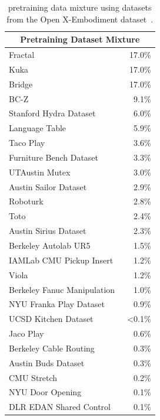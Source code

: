 \begin{appendices}
\begin{table}[th]
    \centering
       \begin{tabular}{lr}
        \toprule
        \multicolumn{2}{c}{\textbf{\method{} Pretraining Dataset Mixture}}\\
        \midrule
        Fractal~\citep{brohan2022rt} & 17.0\% \\
        Kuka~\citep{kalashnikov2018qt} & 17.0\% \\
        Bridge\citep{ebert2021bridge, walke2023bridgedata} & 17.0\% \\
        BC-Z~\citep{jang2022bc} & 9.1\% \\
        Stanford Hydra Dataset~\citep{belkhale2023hydra}  & 6.0\% \\
        Language Table~\citep{lynch2023interactive} & 5.9\% \\
        Taco Play~\citep{rosetebeas2022latent,mees2023grounding} & 3.6\% \\
        Furniture Bench Dataset~\citep{heo2023furniturebench}  & 3.3\% \\
        UTAustin Mutex~\citep{shah2023mutex} & 3.0\% \\
        Austin Sailor Dataset~\citep{nasiriany2022sailor}  & 2.9\% \\
        Roboturk~\citep{DBLP:journals/corr/abs-1811-02790} & 2.8\% \\
        Toto~\citep{zhou2023train} & 2.4\% \\
        Austin Sirius Dataset~\citep{liu2022robot}  & 2.3\% \\
        Berkeley Autolab UR5~\citep{BerkeleyUR5Website} & 1.5\% \\
        IAMLab CMU Pickup Insert~\citep{saxena2023multiresolution}  & 1.2\% \\
        Viola~\citep{zhu2023viola} & 1.2\% \\
        Berkeley Fanuc Manipulation~\citep{fanuc_manipulation2023} & 1.0\% \\
        NYU Franka Play Dataset~\citep{cui2022play}  & 0.9\% \\
        UCSD Kitchen Dataset~\citep{ucsd_kitchens}  & <0.1\% \\
        Jaco Play~\citep{dass2023jacoplay} & 0.6\% \\
        Berkeley Cable Routing~\citep{luo2023multistage} & 0.3\% \\
        Austin Buds Dataset~\citep{zhu2022bottom}  & 0.3\% \\
        CMU Stretch~\citep{mendonca2023structured} & 0.2\% \\
        NYU Door Opening~\citep{pari2021surprising}  & 0.1\% \\
        DLR EDAN Shared Control~\citep{quere_shared_2020}  & 0.1\% \\   
                \bottomrule
        \end{tabular}%
        \caption{\method{} pretraining data mixture using datasets from the Open X-Embodiment dataset~\citep{open_x_embodiment_rt_x_2023}.}
        \label{tab:data_mix}
\end{table}



\end{appendices}
